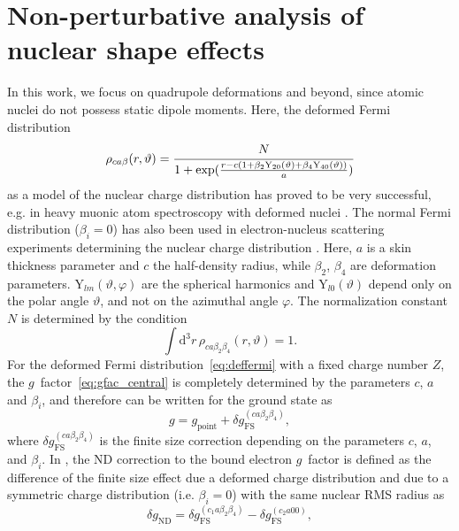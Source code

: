 \section{Non-perturbative analysis of nuclear shape effects}
\label{sec:gfac_shape}
In this work, we focus on quadrupole deformations and beyond, since atomic nuclei do not possess static dipole moments. Here, the deformed Fermi distribution
\begin{equation}
\rho_{ca\beta}(r,\vartheta)=\cfrac{N}{1+\text{exp}(\frac{r-c(1+\beta_2 \text{Y}_{20}(\vartheta)+\beta_4 \text{Y}_{40}(\vartheta))}{a})}
\label{eq:deffermi}
\end{equation}
as a model of the nuclear charge distribution has proved to be very successful, e.g. in heavy muonic atom spectroscopy with deformed nuclei \cite{hitlin1970,tanaka1984}. The normal Fermi distribution (${\beta_i}{=}{0}$) has also been used in electron-nucleus scattering experiments determining the nuclear charge distribution \cite{hahn1956}. Here, $a$ is a skin thickness parameter and $c$ the half-density radius, while $\beta_2$, $\beta_4$ are deformation parameters. $\text{Y}_{lm}(\vartheta,\varphi)$ are the spherical harmonics and $\text{Y}_{l0}(\vartheta)$ depend only on the polar angle $\vartheta$, and not on the azimuthal angle $\varphi$. The normalization constant $N$ is determined by the condition
\begin{equation}
\int \text{d}^3r\, \rho_{ca\beta_2\beta_4}(r,\vartheta)=1.
\end{equation}%
For the deformed Fermi distribution~\eqref{eq:deffermi} with a fixed charge number $Z$, the $g$~factor~\eqref{eq:gfac_central} is completely determined by the parameters $c$, $a$ and $\beta_i$, and therefore can be written for the ground state as
\begin{equation}
g = g_{\text{point}} + \delta g^{(ca\beta_2\beta_4)}_{\text{FS}},
\label{eq:finiteDef}
\end{equation}
where $\delta g^{(ca\beta_2\beta_4)}_{\text{FS}}$ is the finite size correction depending on the parameters $c$, $a$, and $\beta_i$. In \cite{jacek2012}, the ND correction to the bound electron $g$~factor is defined as the difference of the finite size effect due a deformed charge distribution and due to a symmetric charge distribution (i.e. ${\beta_i}{=}{0}$) with the same nuclear RMS radius as
\begin{equation}
\delta g_{\text{ND}}=\delta g^{(c_1a\beta_2\beta_4)}_{\text{FS}} - \delta g^{(c_2a00)}_{\text{FS}},
\label{eq:defdgnd}
\end{equation}
